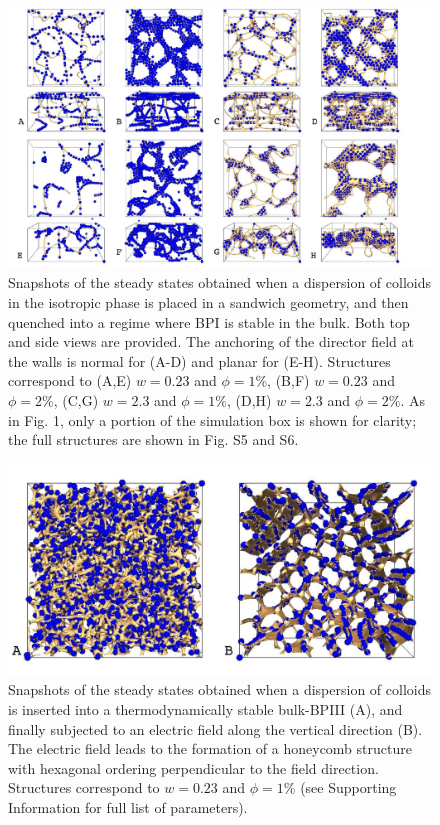 \documentclass[12pt]{article}
\begin{document}
\begin{figure}
\centerline{\includegraphics[width=\textwidth]{text-fig2.jpg}}
\caption{Snapshots of the steady states obtained when a dispersion of colloids in the isotropic phase is placed in a sandwich geometry, 
and then quenched into a regime where BPI is stable in the bulk. Both top and side views are provided.
The anchoring of the director field at the walls is normal for (A-D) and planar for (E-H). 
Structures correspond to (A,E) $w=0.23$ and $\phi=1\%$, 
(B,F) $w=0.23$ and $\phi=2\%$, 
(C,G) $w=2.3$ and $\phi=1\%$,
(D,H) $w=2.3$ and $\phi=2\%$.
As in Fig. 1, only a portion of the simulation box is shown for clarity;
the full structures are shown in Fig. S5 and S6.}
\end{figure}


\begin{figure}
\centerline{\includegraphics[width=\textwidth]{text-fig3.jpg}}
\caption{Snapshots of the steady states obtained when a dispersion of colloids is inserted into a thermodynamically stable bulk-BPIII (A), and finally subjected to an electric field along the vertical direction (B). The electric field leads to the formation of a honeycomb structure with hexagonal ordering perpendicular to the field direction. 
Structures correspond to $w=0.23$ and $\phi=1\%$ (see Supporting Information
for full list of parameters). }
\end{figure}
\end{document}

